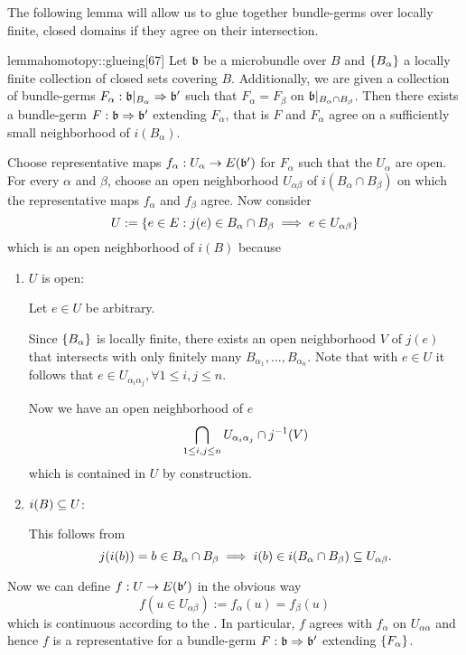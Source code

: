 \begin{myparagraph}
    The following lemma will allow us to glue
    together bundle-germs over locally finite, closed domains if they agree on their intersection.
\end{myparagraph}

\begin{mystatement}{lemma}{homotopy::glueing}[67]
    Let $\bb$ be a microbundle over $B$ and $\{B_\alpha\}$
    a locally finite collection of closed sets covering $B$.
    Additionally, we are given a collection
    of bundle-germs $\germdef{F_\alpha}{\bb[B_\alpha]}{\bb'}$
    such that $F_\alpha = F_\beta$ on $\bb[B_\alpha \cap B_\beta]$.
    Then there exists a bundle-germ $\germdef{F}{\bb}{\bb'}$ extending $F_\alpha$,
    that is $F$ and $F_\alpha$ agree on a sufficiently small neighborhood of $i(B_\alpha)$.
\end{mystatement}

\begin{myproof}
    Choose representative maps $f_\alpha: U_\alpha \to E(\bb')$ for $F_\alpha$ such that the $U_\alpha$ are open.
    For every $\alpha$ and $\beta$, choose an open neighborhood $U_{\alpha\beta}$ of $i(B_\alpha \cap B_\beta)$ on which the representative maps $f_\alpha$ and $f_\beta$ agree.
    Now consider
    \[ U := \{ e \in E:j(e) \in B_\alpha \cap B_\beta \implies e \in U_{\alpha\beta}\} \]
    which is an open neighborhood of $i(B)$ because
    \begin{enumerate}
        \item $U$ is open:

        Let $e \in U$ be arbitrary.

        Since $\{B_\alpha\}$ is locally finite,
        there exists an open neighborhood $V$ of $j(e)$
        that intersects with only finitely many $B_{\alpha_1}, \dots, B_{\alpha_n}$.
        Note that with $e \in U$ it follows that $e \in U_{\alpha_i\alpha_j}, \forall 1 \le i, j \le n$.

        Now we have an open neighborhood of $e$
        \[ \bigcap_{1 \le i, j \le n} U_{\alpha_i\alpha_j} \cap j^{-1}(V) \]
        which is contained in $U$ by construction.

        \item $i(B) \subseteq{} U$:
        
        This follows from
        \[ j(i(b)) = b \in B_\alpha \cap B_\beta \implies i(b) \in i(B_\alpha \cap B_\beta) \subseteq{} U_{\alpha\beta}. \]
    \end{enumerate}
    Now we can define $f: U \to E(\bb')$ in the obvious way
    \[ f(u \in U_{\alpha\beta}) := f_\alpha(u) = f_\beta(u) \]
    which is continuous according to the .
    In particular, $f$ agrees with $f_\alpha$ on $U_{\alpha\alpha}$
    and hence $f$ is a representative for a bundle-germ $\germdef{F}{\bb}{\bb'}$ extending $\{F_\alpha\}$.
\end{myproof}